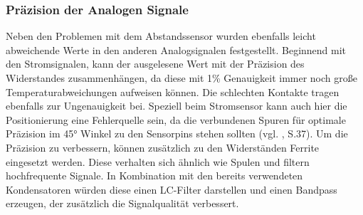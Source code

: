 \subsubsection{Präzision der Analogen Signale}
\label{Mangelnde_Präzision}
Neben den Problemen mit dem Abstandssensor wurden ebenfalls leicht abweichende Werte in den anderen Analogsignalen festgestellt. Beginnend mit den Stromsignalen, kann der ausgelesene Wert mit der Präzision des Widerstandes zusammenhängen, da diese mit 1\% Genauigkeit immer noch große Temperaturabweichungen aufweisen können. Die schlechten Kontakte tragen ebenfalls zur Ungenauigkeit bei. Speziell beim Stromsensor kann auch hier die Positionierung eine Fehlerquelle sein, da die verbundenen Spuren für optimale Präzision im 45° Winkel zu den Sensorpins stehen sollten (vgl. \cite{Stromsensor_texas}, S.37). Um die Präzision zu verbessern, können zusätzlich zu den Widerständen Ferrite eingesetzt werden. Diese verhalten sich ähnlich wie Spulen und filtern hochfrequente Signale. In Kombination mit den bereits verwendeten Kondensatoren würden diese einen LC-Filter darstellen und einen Bandpass erzeugen, der zusätzlich die Signalqualität verbessert.\\
